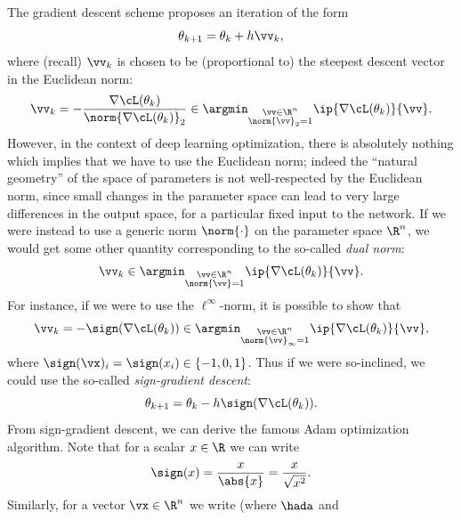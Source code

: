 \documentclass[../../book-main.tex]{subfiles}
\begin{document}
The gradient descent scheme proposes an iteration of the form
\begin{equation}
    \theta_{k + 1} = \theta_{k} + h\vv_{k},
\end{equation}
where (recall) \(\vv_{k}\) is chosen to be (proportional to) the
steepest descent vector in the Euclidean norm:
\begin{equation}
    \vv_{k} = -\frac{\nabla \cL(\theta_{k})}{\norm{\nabla
    \cL(\theta_{k})}_{2}} \in \argmin_{\substack{\vv \in \R^{n}
    \\ \norm{\vv}_{2} = 1}}\ip{\nabla \cL(\theta_{k})}{\vv}.
\end{equation}
However, in the context of deep learning optimization, there is
absolutely nothing which implies that we have to use the Euclidean
norm; indeed the ``natural geometry'' of the space of parameters is
not well-respected by the Euclidean norm, since small changes in the
parameter space can lead to very large differences in the output
space, for a particular fixed input to the network. If we were
instead to use a generic norm \(\norm{\cdot}\) on the parameter space
\(\R^{n}\), we would get some other quantity corresponding to the
so-called \textit{dual norm}:
\begin{equation}
    \vv_{k} \in \argmin_{\substack{\vv \in \R^{n} \\ \norm{\vv} =
    1}}\ip{\nabla \cL(\theta_{k})}{\vv}.
\end{equation}
For instance, if we were to use the \(\ell^{\infty}\)-norm, it is
possible to show that
\begin{equation}
    \vv_{k} = -\sign(\nabla \cL(\theta_{k})) \in
    \argmin_{\substack{\vv \in \R^{n} \\ \norm{\vv}_{\infty} =
    1}}\ip{\nabla \cL(\theta_{k})}{\vv},
\end{equation}
where \(\sign(\vx)_{i} = \sign(x_{i}) \in \{-1, 0, 1\}\). Thus if we
were so-inclined, we could use the so-called \textit{sign-gradient descent}:
\begin{equation}\label{eq:sign_gradient_descent}
    \theta_{k + 1} = \theta_{k} - h\sign(\nabla \cL(\theta_{k})).
\end{equation}
From sign-gradient descent, we can derive the famous Adam
optimization algorithm. Note that for a scalar \(x \in \R\) we can write
\begin{equation}
    \sign(x) = \frac{x}{\abs{x}} = \frac{x}{\sqrt{x^{2}}}.
\end{equation}
Similarly, for a vector \(\vx \in \R^{n}\) we write (where \(\hada\) and
\end{document}
